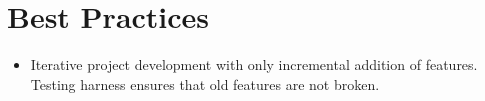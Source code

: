 \section{Best Practices}
\begin{itemize}
\item Iterative project development with only incremental addition of features. Testing harness ensures that old features are not broken.
\end{itemize}
\nocite{Judd.2011, Wilson.2014, Bourque.2014, Schlesinger.1979}


\grid
